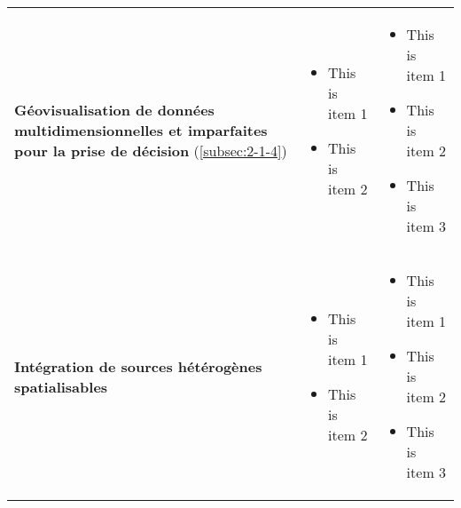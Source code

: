 \begin{tabular}{L{5cm}L{4.5cm}L{4.5cm}}
  \textbf{Géovisualisation de données multidimensionnelles et
  imparfaites pour la prise de décision} (\ref{subsec:2-1-4})
& \begin{minipage}{4cm}
    \begin{itemize}
    \item This is item 1
    \item This is item 2
    \end{itemize}
  \end{minipage}& \begin{minipage}{4cm}
    \begin{itemize}
    \item This is item 1
    \item This is item 2
    \item This is item 3
    \end{itemize}
  \end{minipage} \\
  
  \textbf{Intégration de sources hétérogènes spatialisables}
& \begin{minipage}{4cm}
    \begin{itemize}
    \item This is item 1
    \item This is item 2
    \end{itemize}
  \end{minipage}& \begin{minipage}{4cm}
    \begin{itemize}
    \item This is item 1
    \item This is item 2
    \item This is item 3
    \end{itemize}
  \end{minipage}\\
  
  \bottomrule
\end{tabular}
